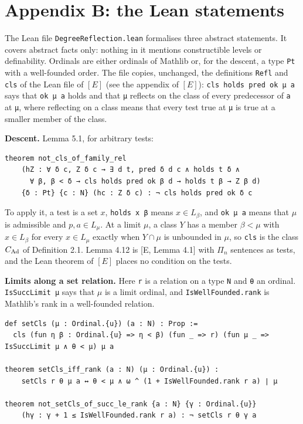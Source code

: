 \documentclass[11pt]{article}
\begin{document}
\section*{Appendix B: the Lean statements}

The Lean file \texttt{DegreeReflection.lean} formalises three abstract statements. It covers abstract facts
only: nothing in it mentions constructible levels or definability. Ordinals are either ordinals of
Mathlib or, for the descent, a type \texttt{Pt} with a well-founded order. The file copies, unchanged, the definitions
\texttt{Refl} and \texttt{cls} of the Lean file of $[E]$ (see the appendix of $[E]$): \texttt{cls holds pred ok μ a}
says that \texttt{ok μ a} holds and that \texttt{μ} reflects on the class of every predecessor of \texttt{a} at
\texttt{μ}, where reflecting on a class means that every test true at \texttt{μ} is true at a smaller member of the
class.

\textbf{Descent.} Lemma 5.1, for arbitrary tests:

\begin{verbatim}
theorem not_cls_of_family_rel
    (hZ : ∀ δ c, Z δ c → ∃ d t, pred δ d c ∧ holds t δ ∧
      ∀ β, β < δ → cls holds pred ok β d → holds t β → Z β d)
    {δ : Pt} {c : N} (hc : Z δ c) : ¬ cls holds pred ok δ c
\end{verbatim}

To apply it, a test is a set $x$, \texttt{holds x β} means $x \in L_\beta$, and \texttt{ok μ a} means that $\mu$ is admissible
and $p, a \in L_\mu$. At a limit $\mu$, a class $Y$ has a member $\beta < \mu$ with $x \in L_\beta$ for
every $x \in L_\mu$ exactly when $Y \cap \mu$ is unbounded in $\mu$, so \texttt{cls} is the class $C_{\mathrm{Ad}}$ of
Definition 2.1. Lemma 4.12 is [E, Lemma 4.1] with $\Pi_n$ sentences as tests, and the Lean theorem of $[E]$ places no
condition on the tests.

\textbf{Limits along a set relation.} Here \texttt{r} is a relation on a type \texttt{N} and \texttt{θ} an ordinal.
\texttt{IsSuccLimit μ} says that $\mu$ is a limit ordinal, and \texttt{IsWellFounded.rank} is Mathlib's rank in a
well-founded relation.

\begin{verbatim}
def setCls (μ : Ordinal.{u}) (a : N) : Prop :=
  cls (fun η β : Ordinal.{u} => η < β) (fun _ => r) (fun μ _ => IsSuccLimit μ ∧ θ < μ) μ a

theorem setCls_iff_rank (a : N) (μ : Ordinal.{u}) :
    setCls r θ μ a ↔ θ < μ ∧ ω ^ (1 + IsWellFounded.rank r a) ∣ μ

theorem not_setCls_of_succ_le_rank {a : N} {γ : Ordinal.{u}}
    (hγ : γ + 1 ≤ IsWellFounded.rank r a) : ¬ setCls r θ γ a
\end{verbatim}
\end{document}
